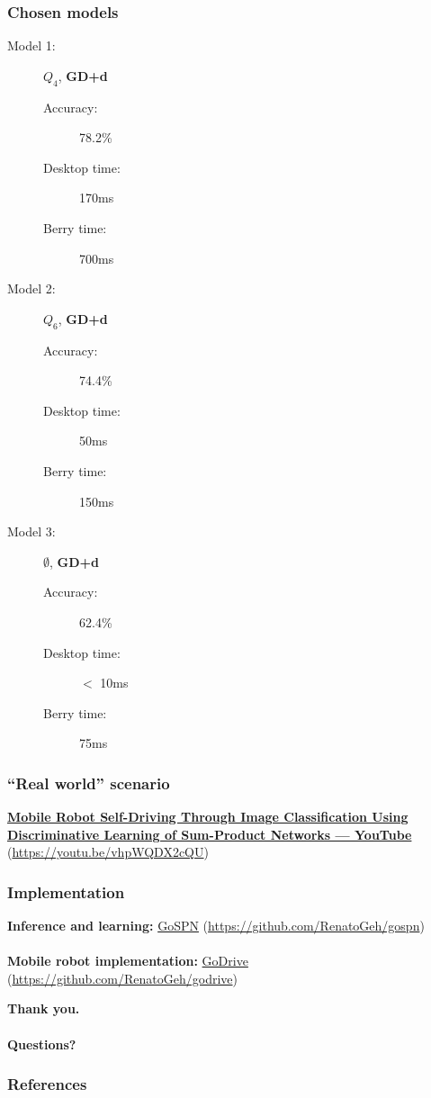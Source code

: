 \documentclass{beamer}
\begin{document}
\begin{frame}
  \frametitle{Chosen models}

  \begin{description}
    \item[Model 1:] $Q_4$, \textbf{GD+d}
      \begin{description}
        \item[Accuracy:] 78.2\%
        \item[Desktop time:] 170ms
        \item[Berry time:] 700ms
      \end{description}
    \item[Model 2:] $Q_6$, \textbf{GD+d}
      \begin{description}
        \item[Accuracy:] 74.4\%
        \item[Desktop time:] 50ms
        \item[Berry time:] 150ms
      \end{description}
    \item[Model 3:] $\emptyset$, \textbf{GD+d}
      \begin{description}
        \item[Accuracy:] 62.4\%
        \item[Desktop time:] $<$ 10ms
        \item[Berry time:] 75ms
      \end{description}
  \end{description}
\end{frame}

\begin{frame}
  \frametitle{``Real world'' scenario}

  \footnotesize\centering\textbf{\href{https://youtu.be/vhpWQDX2cQU}{Mobile Robot Self-Driving Through Image Classification Using
  Discriminative Learning of Sum-Product Networks --- YouTube}}
  (\url{https://youtu.be/vhpWQDX2cQU})
\end{frame}

\begin{frame}
  \frametitle{Implementation}
  \centering
  \large\textbf{Inference and learning:} \href{https://github.com/RenatoGeh/gospn}{GoSPN}
  (\url{https://github.com/RenatoGeh/gospn})\\~\\

  \textbf{Mobile robot implementation:} \href{https://github.com/RenatoGeh/godrive}{GoDrive}
  (\url{https://github.com/RenatoGeh/godrive})

\end{frame}

\begin{frame}[standout]
  \textbf{Thank you.\\~\\Questions?}
\end{frame}

\begin{frame}[t,allowframebreaks]
  \frametitle{References}
  \printbibliography[heading=none]
\end{frame}
\end{document}
